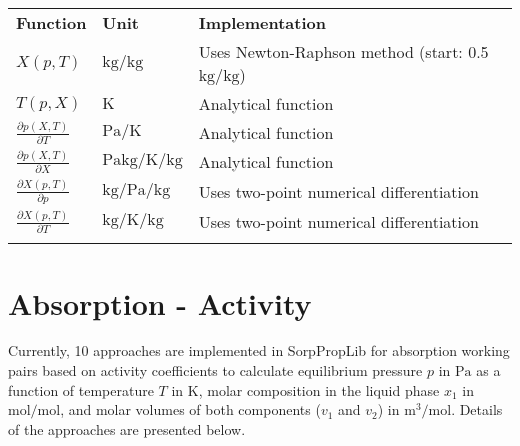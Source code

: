 \begin{longtable}[l]{l|l|l}
	\toprule
	\addlinespace
	\textbf{Function} & \textbf{Unit} &	\textbf{Implementation} \\
	\addlinespace
	\midrule
	\endhead
	
	\bottomrule
	\endfoot
	\bottomrule
	\endlastfoot
	\addlinespace
	
	$X(p,T)$& $\si{\kilogram\per\kilogram}$ & Uses Newton-Raphson method (start: 0.5 $\si{\kilogram\per\kilogram}$) \\
	$T(p,X)$& $\si{\kelvin}$ & Analytical function \\
	$\frac{\partial p(X,T)}{\partial T}$	& $\si{\pascal\per\kelvin}$ & Analytical function\\
	$\frac{\partial p(X,T)}{\partial X}$	& $\si{\pascal\kilogram\per\kelvin\per\kilogram}$ & Analytical function\\
	$\frac{\partial X(p,T)}{\partial p}$	& $\si{\kilogram\per\pascal\per\kilogram}$ & Uses two-point numerical differentiation\\
	$\frac{\partial X(p,T)}{\partial T}$	& $\si{\kilogram\per\kelvin\per\kilogram}$ & Uses two-point numerical differentiation\\
	
	\addlinespace
\end{longtable}
%
\section{Absorption - Activity}
\label{cha:abs:act}
%
Currently, 10 approaches are implemented in SorpPropLib for absorption working pairs based on activity coefficients to calculate equilibrium pressure $p$ in $\si{\pascal}$ as a function of temperature $T$ in $\si{\kelvin}$, molar composition in the liquid phase $x_1$ in $\si{\mole\per\mole}$, and molar volumes of both components ($v_1$ and $v_2$) in $\si{\cubic\meter\per\mole}$. Details of the approaches are presented below.
